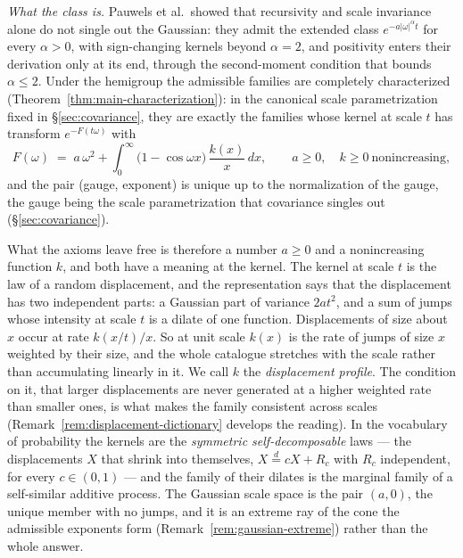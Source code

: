 \emph{What the class is.} Pauwels et al.\ showed that recursivity and scale invariance alone
do not single out the Gaussian: they admit the extended class $e^{-a|\omega|^\alpha t}$ for
every $\alpha > 0$, with sign-changing kernels beyond $\alpha = 2$, and positivity enters
their derivation only at its end, through the second-moment condition that bounds
$\alpha \le 2$. Under the hemigroup the admissible families are completely characterized
(Theorem~\ref{thm:main-characterization}): in the canonical scale parametrization fixed in
\S\ref{sec:covariance}, they are exactly the families whose kernel at scale $t$ has
transform $e^{-F(t\omega)}$ with
\[
  F(\omega) \;=\; a\,\omega^2 + \int_0^\infty \bigl(1 - \cos\omega x\bigr)\,\frac{k(x)}{x}\,dx,
  \qquad a \ge 0, \quad k \ge 0 \ \text{nonincreasing},
\]
and the pair (gauge, exponent) is unique up to the normalization of the gauge, the gauge
being the scale parametrization that covariance singles out (\S\ref{sec:covariance}).

What the axioms leave free is therefore a number
$a \ge 0$ and a nonincreasing function $k$, and both have a meaning at the kernel. The
kernel at scale $t$ is the law of a random displacement, and the representation says that
the displacement has two independent parts: a Gaussian part of variance $2at^2$, and a sum
of jumps whose intensity at scale $t$ is a dilate of one function. Displacements of size
about $x$ occur at rate $k(x/t)/x$. So at unit scale $k(x)$ is the rate of jumps of
size $x$ weighted by their size, and the whole catalogue stretches with the scale rather
than accumulating linearly in it. We call $k$ the
\emph{displacement profile}. The condition on it, that
larger displacements are never generated at a higher weighted rate than smaller ones, is
what makes the family consistent across scales (Remark~\ref{rem:displacement-dictionary}
develops the reading). In the vocabulary of probability the kernels are the \emph{symmetric
self-decomposable} laws --- the displacements $X$ that shrink into themselves,
$X \stackrel{d}{=} cX + R_c$ with $R_c$ independent, for every $c \in (0,1)$ --- and the
family of their dilates is the marginal family of a self-similar additive process. The
Gaussian scale space is the pair $(a,0)$, the unique member with no jumps, and it is an
extreme ray of the cone the admissible exponents form (Remark~\ref{rem:gaussian-extreme})
rather than the whole answer.

